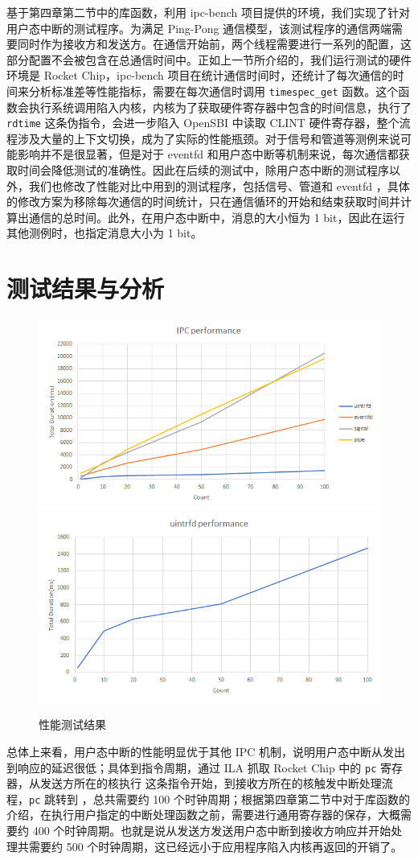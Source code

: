 基于第四章第二节中的库函数，利用 ipc-bench 项目提供的环境，我们实现了针对用户态中断的测试程序。为满足 Ping-Pong 通信模型，该测试程序的通信两端需要同时作为接收方和发送方。在通信开始前，两个线程需要进行一系列的配置，这部分配置不会被包含在总通信时间中。正如上一节所介绍的，我们运行测试的硬件环境是 Rocket Chip，ipc-bench 项目在统计通信时间时，还统计了每次通信的时间来分析标准差等性能指标，需要在每次通信时调用 \texttt{timespec\_get} 函数。这个函数会执行系统调用陷入内核，内核为了获取硬件寄存器中包含的时间信息，执行了 \texttt{rdtime} 这条伪指令，会进一步陷入 OpenSBI 中读取 CLINT 硬件寄存器，整个流程涉及大量的上下文切换，成为了实际的性能瓶颈。对于信号和管道等测例来说可能影响并不是很显著，但是对于 eventfd 和用户态中断等机制来说，每次通信都获取时间会降低测试的准确性。因此在后续的测试中，除用户态中断的测试程序以外，我们也修改了性能对比中用到的测试程序，包括信号、管道和 eventfd ，具体的修改方案为移除每次通信的时间统计，只在通信循环的开始和结束获取时间并计算出通信的总时间。此外，在用户态中断中，消息的大小恒为 1 bit，因此在运行其他测例时，也指定消息大小为 1 bit。

\section{测试结果与分析}

\begin{figure}
    \centering
        {\includegraphics[width=0.45\linewidth]{figures/bench1.jpg}}
        {\includegraphics[width=0.45\linewidth]{figures/bench2.jpg}}
    \caption{性能测试结果}
    \label{fig:multi-image}
\end{figure}

总体上来看，用户态中断的性能明显优于其他 IPC 机制，说明用户态中断从发出到响应的延迟很低；具体到指令周期，通过 ILA 抓取 Rocket Chip 中的 \texttt{pc} 寄存器，从发送方所在的核执行 \Iuipisend 这条指令开始，到接收方所在的核触发中断处理流程，\texttt{pc} 跳转到 \Rutvec ，总共需要约 100 个时钟周期；根据第四章第二节中对于库函数的介绍，在执行用户指定的中断处理函数之前，需要进行通用寄存器的保存，大概需要约 400 个时钟周期。也就是说从发送方发送用户态中断到接收方响应并开始处理共需要约 500 个时钟周期，这已经远小于应用程序陷入内核再返回的开销了。

